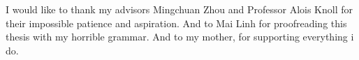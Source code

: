\vspace{1cm}
I would like to thank my advisors Mingchuan Zhou and Professor Alois Knoll for their impossible patience and  aspiration. And to Mai Linh for proofreading this thesis with my horrible grammar. And to my mother, for supporting everything i do.